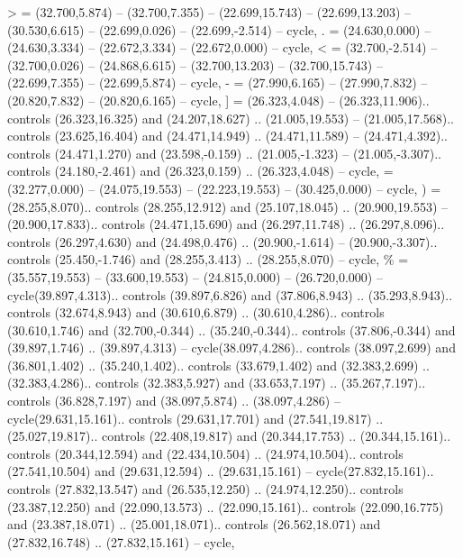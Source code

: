 {>} = {(32.700,5.874) -- (32.700,7.355) -- (22.699,15.743) -- (22.699,13.203) -- (30.530,6.615) -- (22.699,0.026) -- (22.699,-2.514) -- cycle},
{.} = {(24.630,0.000) -- (24.630,3.334) -- (22.672,3.334) -- (22.672,0.000) -- cycle},
{<} = {(32.700,-2.514) -- (32.700,0.026) -- (24.868,6.615) -- (32.700,13.203) -- (32.700,15.743) -- (22.699,7.355) -- (22.699,5.874) -- cycle},
{-} = {(27.990,6.165) -- (27.990,7.832) -- (20.820,7.832) -- (20.820,6.165) -- cycle},
{]} = {(26.323,4.048) -- (26.323,11.906).. controls (26.323,16.325) and (24.207,18.627) .. (21.005,19.553) -- (21.005,17.568).. controls (23.625,16.404) and (24.471,14.949) .. (24.471,11.589) -- (24.471,4.392).. controls (24.471,1.270) and (23.598,-0.159) .. (21.005,-1.323) -- (21.005,-3.307).. controls (24.180,-2.461) and (26.323,0.159) .. (26.323,4.048) -- cycle},
{\ctpbackslash} = {(32.277,0.000) -- (24.075,19.553) -- (22.223,19.553) -- (30.425,0.000) -- cycle},
{)} = {(28.255,8.070).. controls (28.255,12.912) and (25.107,18.045) .. (20.900,19.553) -- (20.900,17.833).. controls (24.471,15.690) and (26.297,11.748) .. (26.297,8.096).. controls (26.297,4.630) and (24.498,0.476) .. (20.900,-1.614) -- (20.900,-3.307).. controls (25.450,-1.746) and (28.255,3.413) .. (28.255,8.070) -- cycle},
{\%} = {(35.557,19.553) -- (33.600,19.553) -- (24.815,0.000) -- (26.720,0.000) -- cycle(39.897,4.313).. controls (39.897,6.826) and (37.806,8.943) .. (35.293,8.943).. controls (32.674,8.943) and (30.610,6.879) .. (30.610,4.286).. controls (30.610,1.746) and (32.700,-0.344) .. (35.240,-0.344).. controls (37.806,-0.344) and (39.897,1.746) .. (39.897,4.313) -- cycle(38.097,4.286).. controls (38.097,2.699) and (36.801,1.402) .. (35.240,1.402).. controls (33.679,1.402) and (32.383,2.699) .. (32.383,4.286).. controls (32.383,5.927) and (33.653,7.197) .. (35.267,7.197).. controls (36.828,7.197) and (38.097,5.874) .. (38.097,4.286) -- cycle(29.631,15.161).. controls (29.631,17.701) and (27.541,19.817) .. (25.027,19.817).. controls (22.408,19.817) and (20.344,17.753) .. (20.344,15.161).. controls (20.344,12.594) and (22.434,10.504) .. (24.974,10.504).. controls (27.541,10.504) and (29.631,12.594) .. (29.631,15.161) -- cycle(27.832,15.161).. controls (27.832,13.547) and (26.535,12.250) .. (24.974,12.250).. controls (23.387,12.250) and (22.090,13.573) .. (22.090,15.161).. controls (22.090,16.775) and (23.387,18.071) .. (25.001,18.071).. controls (26.562,18.071) and (27.832,16.748) .. (27.832,15.161) -- cycle},
